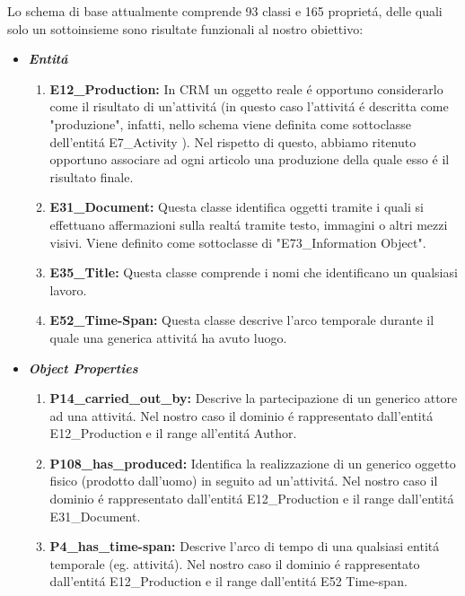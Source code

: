 \documentclass[11pt,a4paper]{article}
\begin{document}
 Lo schema di base attualmente comprende  93 classi e 165 propriet\'a, delle quali solo un sottoinsieme sono risultate funzionali al nostro obiettivo:
	 \begin{itemize}
	 	
	 	
	 	\item \textbf{\textit{Entit\'a}}
	 	\begin{enumerate}
	 		\item \textbf{E12\_Production:} In CRM un oggetto reale \'e opportuno considerarlo come il risultato di un'attivit\'a (in questo caso l'attivit\'a \'e descritta come "produzione",  infatti, nello schema viene definita come sottoclasse dell'entit\'a E7\_Activity ).  Nel rispetto di questo, abbiamo ritenuto opportuno associare ad ogni articolo una produzione della quale esso \'e il risultato finale.
	 		\item \textbf{E31\_Document:} Questa classe identifica oggetti tramite i quali si effettuano affermazioni sulla realt\'a tramite testo, immagini o altri mezzi visivi. Viene definito come sottoclasse di "E73\_Information Object".
	 		\item \textbf{E35\_Title:} Questa classe comprende i nomi che identificano un qualsiasi lavoro.
	 		\item \textbf{E52\_Time-Span:} Questa classe descrive l'arco temporale durante il quale una generica attivit\'a ha avuto luogo.
	 	\end{enumerate}
	 	
	 	
	 	\item \textbf{\textit{Object Properties}}
	 		\begin{enumerate}
	 			\item \textbf{P14\_carried\_out\_by:} Descrive la  partecipazione di un generico attore ad una attivit\'a. Nel nostro caso il dominio \'e rappresentato dall'entit\'a E12\_Production e il range all'entit\'a Author.
	 			
	 			\item \textbf{P108\_has\_produced:} Identifica la realizzazione di un generico oggetto fisico (prodotto dall'uomo) in seguito ad un'attivit\'a. Nel nostro caso il dominio \'e rappresentato dall'entit\'a  E12\_Production e il range dall'entit\'a E31\_Document.
	 			
	 			\item \textbf{P4\_has\_time-span:} Descrive l'arco di tempo di una qualsiasi entit\'a temporale (eg. attivit\'a). Nel nostro caso il dominio \'e rappresentato dall'entit\'a E12\_Production e il range dall'entit\'a E52 Time-span.
	 			

\end{enumerate}
\end{itemize}
\end{document}
